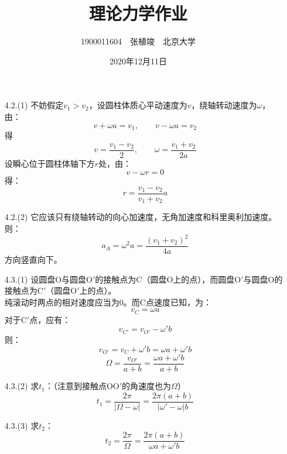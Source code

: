 \documentclass[a4paper,fontset=windows]{ctexart}
\begin{document}
    \title{\textbf{理论力学作业}}
    \author{1900011604\ \ 张植竣\ \ 北京大学}
    \date{2020年12月11日}

    \maketitle

    \begin{itemize}

        \section*{第五章}

        \item[4.2.(1)]
        不妨假定$v_1 > v_2$，设圆柱体质心平动速度为$v$，绕轴转动速度为$\omega$，由：
        \[
        v + \omega a = v_1,\qquad v - \omega a = v_2
        \]
        得
        \[
        v = \frac{v_1 - v_2}{2},\qquad \omega = \frac{v_1 + v_2}{2a}
        \]
        设瞬心位于圆柱体轴下方$r$处，由：
        \[
        v - \omega r = 0
        \]
        得：
        \[
        r = \frac{v_1 - v_2}{v_1 + v_2}a
        \]

        \medskip
        \item[4.2.(2)]
        它应该只有绕轴转动的向心加速度，无角加速度和科里奥利加速度。则：
        \[
        a_A = \omega^2 a = \frac{(v_1 + v_2)^2}{4a}
        \]
        方向竖直向下。

        \bigskip
        \item[4.3.(1)]
        设圆盘O与圆盘$\mathrm{O}'$的接触点为C（圆盘O上的点），而圆盘$\mathrm{O}'$与圆盘O的接触点为$\mathrm{C}'$（圆盘$\mathrm{O}'$上的点）。 \\
        纯滚动时两点的相对速度应当为0。而C点速度已知，为：
        \[
        v_C = \omega a
        \]
        对于$\mathrm{C}'$点，应有：
        \[
        v_{C'} = v_{O'} - \omega' b
        \]
        则：
        \[
        v_{O'} = v_C + \omega' b = \omega a + \omega' b
        \]
        \[
        \varOmega = \frac{v_{O'}}{a+b} = \frac{\omega a + \omega' b}{a+b}
        \]

        \medskip
        \item[4.3.(2)]
        求$t_1$：（注意到接触点O$\mathrm{O}'$的角速度也为$\varOmega$）
        \[
        t_1 = \frac{2\pi}{|\varOmega - \omega|} = \frac{2\pi(a+b)}{|\omega'-\omega|b}
        \]

        \medskip
        \item[4.3.(3)]
        求$t_2$：
        \[
        t_2 = \frac{2\pi}{\varOmega} = \frac{2\pi(a+b)}{\omega a + \omega' b}
        \]


\end{itemize}
\end{document}
